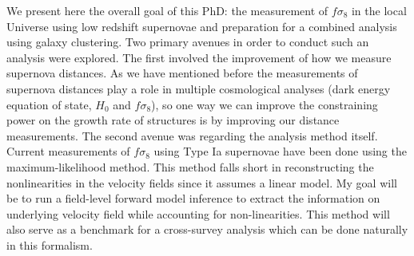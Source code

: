 We present here the overall goal of this PhD: the measurement of $f\sigma_8$ in the local Universe using low redshift supernovae and preparation for a combined analysis using galaxy clustering. 
Two primary avenues in order to conduct such an analysis were explored. The first involved the improvement of how we measure supernova distances. As we have mentioned before the 
measurements of supernova distances play a role in multiple cosmological analyses (dark energy equation of state, $H_0$ and $f\sigma_8$), so one way we can improve the constraining 
power on the growth rate of structures is by improving our distance measurements. The second avenue was regarding the analysis method itself. Current measurements of 
$f\sigma_8$ using Type Ia supernovae have been done using the maximum-likelihood method. This method falls short in reconstructing the nonlinearities in the velocity fields 
since it assumes a linear model. My goal will be to run a field-level forward model inference to extract the information on underlying velocity field while 
accounting for non-linearities. This 
method will also serve as a benchmark for a cross-survey analysis which can be done naturally in this formalism. \\